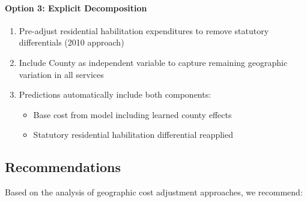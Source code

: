 \paragraph{Option 3: Explicit Decomposition}
\begin{enumerate}
    \item Pre-adjust residential habilitation expenditures to remove statutory differentials (2010 approach)
    \item Include County as independent variable to capture remaining geographic variation in all services
    \item Predictions automatically include both components:
    \begin{itemize}
        \item Base cost from model including learned county effects
        \item Statutory residential habilitation differential reapplied
    \end{itemize}
\end{enumerate}

\subsection{Recommendations}
\label{subsec:county-recommendations}

Based on the analysis of geographic cost adjustment approaches, we recommend:

